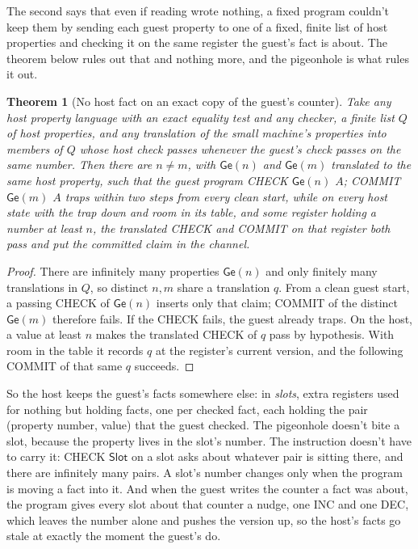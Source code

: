 \documentclass[11pt,twoside]{article}
\theoremstyle{thielethm}
\newtheorem{theorem}{Theorem}[section]
\theoremstyle{thieledef}
\theoremstyle{thieledef}
\theoremstyle{thieledef}
\theoremstyle{thielethm}
\theoremstyle{thieleobs}
\theoremstyle{thielethm}
\begin{document}
The second says that even if reading wrote nothing, a fixed program couldn't keep them by sending each
guest property to one of a fixed, finite list of host properties and checking it on the same
register the guest's fact is about. The theorem below rules out that and nothing more, and the
pigeonhole is what rules it out.

\begin{theorem}[No host fact on an exact copy of the guest's counter]\label{thm:u34-nocopy}
Take any host property language with an exact equality test and any checker, a finite list $Q$
of host properties, and any translation of the small machine's properties into members of $Q$
whose host check passes whenever the guest's check passes on the same number. Then there are
$n \ne m$, with $\mathsf{Ge}(n)$ and $\mathsf{Ge}(m)$ translated to the same host property, such
that the guest program CHECK $\mathsf{Ge}(n)$ $A$; COMMIT $\mathsf{Ge}(m)$ $A$ traps within two
steps from every clean start, while on every host state with the trap down and room in its table, and
some register holding a number at least $n$, the translated CHECK and COMMIT on that register both
pass and put the committed claim in the channel.
\end{theorem}

\begin{proof}
There are infinitely many properties $\mathsf{Ge}(n)$ and only finitely many
translations in $Q$, so distinct $n,m$ share a translation $q$. From a clean
guest start, a passing CHECK of $\mathsf{Ge}(n)$ inserts only that claim;
COMMIT of the distinct $\mathsf{Ge}(m)$ therefore fails. If the CHECK fails,
the guest already traps. On the host, a value at least $n$ makes the translated
CHECK of $q$ pass by hypothesis. With room in the table it records $q$ at the
register's current version, and the following COMMIT of that same $q$ succeeds.
\end{proof}

So the host keeps the guest's facts somewhere else: in \emph{slots}, extra registers used for
nothing but holding facts, one per checked fact, each holding the pair (property number, value)
that the guest checked. The pigeonhole doesn't bite a slot, because the property lives in the
slot's number. The instruction doesn't have to carry it: CHECK $\mathsf{Slot}$ on a slot asks about whatever pair
is sitting there, and there are infinitely many pairs. A slot's number changes only when the program is
moving a fact into it. And when the guest writes the counter a fact was about, the program gives
every slot about that counter a nudge, one INC and one DEC, which leaves the number alone and
pushes the version up, so the host's facts go stale at exactly the moment the guest's do.
\end{document}
